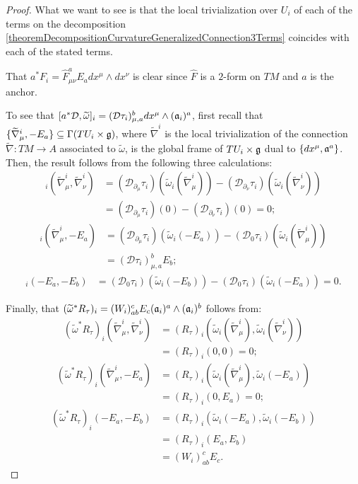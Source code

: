 \begin{proof}
What we want to see is that the local trivialization over $U_i$ of each of the terms on the decomposition \ref{theoremDecompositionCurvatureGeneralizedConnection3Terms} coincides with each of the stated terms.

That $a^*F_i = \hat F^a_{\mu \nu} E_a dx^\mu \wedge dx^\nu$ is clear since $\hat F$ is a $2$-form on $TM$ and $a$ is the anchor.

To see that $[a^* \mathcal D, \widetilde \omega]_i = (\mathcal D \tau_i)^b_{\mu, a} dx^\mu \wedge (\mathfrak{a}_i)^a$, first recall that $\{\widetilde \nabla^i_\mu, -E_a\} \subseteq \Gamma(TU_i \times \mathfrak{g})$, where $\tilde \nabla^i$ is the local trivialization of the connection $\tilde \nabla:TM \to A$ associated to $\tilde \omega$, is the global frame of $TU_i \times \mathfrak{g}$ dual to $\{dx^\mu, \mathfrak{a}^a\}$. Then, the result follows from the following three calculations:
\begin{align*}
    [a^* \mathcal D, \tilde \omega]_i(\tilde \nabla^i_\mu, \tilde \nabla^i_\nu) 
        &= (\mathcal D_{\partial_\mu} \tau_i) (\tilde \omega_i(\tilde \nabla^i_\mu)) - (\mathcal D_{\partial_\nu} \tau_i) (\tilde \omega_i(\tilde \nabla^i_\nu))\\
        &= (\mathcal D_{\partial_\mu} \tau_i) (0) - (\mathcal D_{\partial_\nu} \tau_i)(0) = 0;
\end{align*}
\begin{align*}
    [a^* \mathcal D, \tilde \omega]_i(\tilde \nabla^i_\mu, -E_a) 
        &= (\mathcal D_{\partial_\mu} \tau_i) (\tilde \omega_i(-E_a)) - (\mathcal D_{0} \tau_i) (\tilde \omega_i(\tilde \nabla^i_\mu))\\
        &= (\mathcal D \tau_i)^b_{\mu, a} E_b;
\end{align*}
\begin{align*}
    [a^* \mathcal D, \tilde \omega]_i(-E_a, -E_b) 
        &= (\mathcal D_{0} \tau_i) (\tilde \omega_i(-E_b)) - (\mathcal D_{0} \tau_i) (\tilde \omega_i(-E_a)) = 0.
\end{align*}

Finally, that $(\widetilde \omega^* R_\tau)_i = (W_i)^c_{ab} E_c (\mathfrak{a}_i)^a \wedge (\mathfrak{a}_i)^b$ follows from:
\begin{align*}
    (\tilde \omega^* R_\tau)_i(\tilde \nabla^i_\mu, \tilde \nabla^i_\nu) 
        &= (R_\tau)_i(\tilde \omega_i(\tilde \nabla^i_\mu), \tilde \omega_i(\tilde \nabla^i_\nu)) \\
        &= (R_\tau)_i(0, 0) = 0;
\end{align*}
\begin{align*}
    (\tilde \omega^* R_\tau)_i(\tilde \nabla^i_\mu, -E_a) 
        &= (R_\tau)_i(\tilde \omega_i(\tilde \nabla^i_\mu), \tilde \omega_i(-E_a)) \\
        &= (R_\tau)_i(0, E_a) = 0;
\end{align*}
\begin{align*}
    (\tilde \omega^* R_\tau)_i(-E_a, -E_b) 
        &= (R_\tau)_i(\tilde \omega_i(-E_a), \tilde \omega_i(-E_b)) \\
        &= (R_\tau)_i(E_a, E_b) \\
        &= (W_i)^c_{ab} E_c.
\end{align*}
\end{proof}


